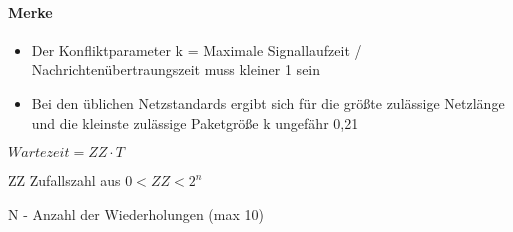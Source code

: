 \paragraph{Merke} 
\begin{itemize}
\item Der Konfliktparameter k = Maximale Signallaufzeit /  Nachrichtenübertraungszeit muss kleiner 1 sein
\item Bei den üblichen Netzstandards ergibt sich für die größte zulässige Netzlänge und die kleinste zulässige Paketgröße k ungefähr 0,21
\end{itemize}

$ Wartezeit = ZZ \cdot T $

ZZ Zufallszahl aus $0<ZZ<2^n$

N - Anzahl der Wiederholungen (max 10)
